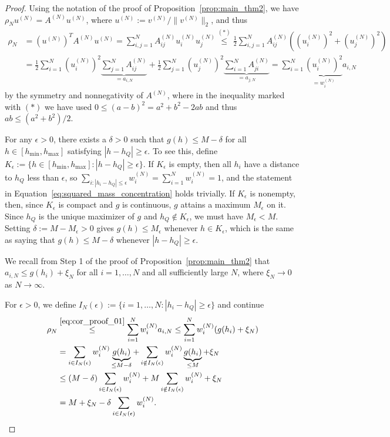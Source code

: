 \begin{proof}
    Using the notation of the proof of Proposition~\ref{prop:main_thm2}, we have $\rho_Nu^{(N)}=A^{(N)}u^{(N)}$, where $u^{(N)}:=v^{(N)}/\|v^{(N)}\|_2$, and thus
    \begin{equation}\label{eq:cor_proof_01}
        \begin{aligned}
            \rho_N&=(u^{(N)})^{T}A^{(N)}u^{(N)}=\sum_{i,j=1}^{N}A_{ij}^{(N)}u_i^{(N)}u_j^{(N)}\stackrel{(\ast)}{\le}\frac{1}{2}\sum_{i,j=1}^{N}A_{ij}^{(N)}\left((u_i^{(N)})^2+(u_j^{(N)})^2\right)\\&
            =\frac{1}{2}\sum_{i=1}^{N}(u_i^{(N)})^2\underbrace{\sum_{j=1}^{N}A_{ij}^{(N)}}_{=a_{i,N}}+\frac{1}{2}\sum_{j=1}^{N}(u_j^{(N)})^2\underbrace{\sum_{i=1}^{N}A_{ji}^{(N)}}_{=a_{j,N}}=\sum_{i=1}^{N}\underbrace{(u_i^{(N)})^2}_{=w_i^{(N)}}a_{i,N}
        \end{aligned}
    \end{equation}
    by the symmetry and nonnegativity of $A^{(N)}$, where in the inequality marked with $(\ast)$ we have used $0\le (a-b)^2=a^2+b^2-2ab$ and thus $ab\le (a^2+b^2)/2$.

    For any $\epsilon>0$, there exists a $\delta>0$ such that $g(h)\le M-\delta$ for all $h\in[h_{\min},h_{\max}]$ satisfying $|h-h_Q|\ge\epsilon$. To see this, define $K_{\epsilon}:=\{h\in[h_{\min},h_{\max}]:|h-h_Q|\ge\epsilon\}$. If $K_{\epsilon}$ is empty, then all $h_i$ have a distance to $h_Q$ less than $\epsilon$, so $\sum_{i:|h_i-h_Q|\le\epsilon}w_i^{(N)}=\sum_{i=1}^{N}w_i^{(N)}=1$, and the statement in Equation~\eqref{eq:squared_mass_concentration} holds trivially. If $K_{\epsilon}$ is nonempty, then, since $K_{\epsilon}$ is compact and $g$ is continuous, $g$ attains a maximum $M_{\epsilon}$ on it. Since $h_Q$ is the unique maximizer of $g$ and $h_Q\notin K_{\epsilon}$, we must have $M_{\epsilon}<M$. Setting $\delta:=M-M_{\epsilon}>0$ gives $g(h)\le M_{\epsilon}$ whenever $h\in K_{\epsilon}$, which is the same as saying that $g(h)\le M-\delta$ whenever $|h-h_Q|\ge\epsilon$.

    We recall from Step 1 of the proof of Proposition~\ref{prop:main_thm2} that $a_{i,N}\le g(h_i)+\xi_N$ for all $i=1,\dots,N$ and all sufficiently large $N$, where $\xi_N\to0$ as $N\to\infty$.

    For $\epsilon>0$, we define $I_N(\epsilon):=\{i=1,\dots,N:|h_i-h_Q|\ge\epsilon\}$ and continue
    \begin{align*}
        \rho_N&\stackrel{\eqref{eq:cor_proof_01}}{\le}\sum_{i=1}^{N}w_i^{(N)}a_{i,N}\le\sum_{i=1}^{N}w_i^{(N)}(g(h_i)+\xi_N)\\&
        =\sum_{i\in I_N(\epsilon)}w_i^{(N)}\underbrace{g(h_i)}_{\le M-\delta}+\sum_{i\notin I_N(\epsilon)}w_i^{(N)}\underbrace{g(h_i)}_{\le M}+\xi_N\\&\le(M-\delta)\sum_{i\in I_N(\epsilon)}w_i^{(N)}+M\sum_{i\notin I_N(\epsilon)}w_i^{(N)}+\xi_N\\&
        =M+\xi_N-\delta\sum_{i\in I_N(\epsilon)}w_i^{(N)}.
    \end{align*}


\end{proof}
